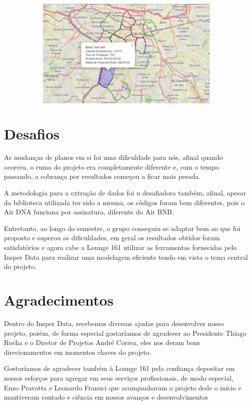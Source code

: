 \begin{figure}
\begin{subfigure}{0.49\linewidth}
    \end{subfigure}
    \hfill
    \begin{subfigure}{0.49\linewidth}
        \includegraphics[width = \textwidth]{relatorios/lounge/imagens/4.jpg}
    \end{subfigure}

\end{figure}



\section*{Desafios}

As mudanças de planos em si foi uma dificuldade para nós, afinal quando
ocorreu, o rumo do projeto era completamente diferente e, com o tempo 
passando, a cobrança por resultados começou a ficar mais pesada.

A metodologia para a extração de dados foi u desafiadora também, afinal, 
apesar da biblioteca utilizada ter sido a mesma, os códigos foram bem diferentes, 
pois o Air DNA funciona por assinatura, diferente do Air BNB.

Entretanto, ao longo do semestre, o grupo conseguiu se adaptar bem ao que 
foi proposto e superou as dificuldades, em geral os resultados obtidos foram 
satisfatórios e agora cabe a Lounge 161 utilizar as ferramentas fornecidas pelo 
Insper Data para realizar uma modelagem eficiente tendo em vista o tema central 
do projeto.

\section*{Agradecimentos}

Dentro do Insper Data, recebemos diversas ajudas para desenvolver nosso 
projeto, porém, de forma especial gostaríamos de agradecer ao Presidente Thiago Rocha 
e o Diretor de Projetos André Correa, eles nos deram bons direcionamentos em 
momentos chaves do projeto.

Gostaríamos de agradecer também à Lounge 161 pela confiança depositar em 
nossos esforços para agregar em seus serviços profissionais, de modo especial, Enzo 
Pravatta e Leonardo Franuci que acompanharam o projeto dede o início e mantiveram 
contado e ciência em nossos avanços e desenvolvimentos
